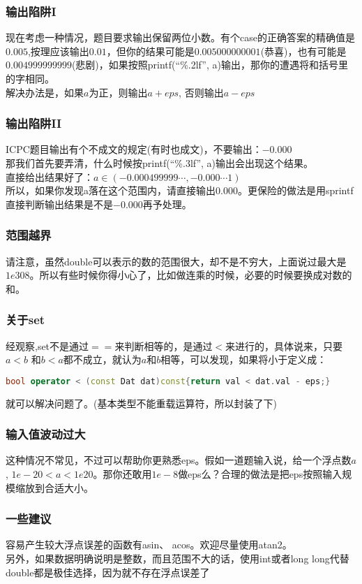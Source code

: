     \subsubsection{输出陷阱I}
	现在考虑一种情况，题目要求输出保留两位小数。有个case的正确答案的精确值是$0.005$,按理应该输出$0.01$，但你的结果可能是$0.005000000001$(恭喜)，也有可能是$0.004999999999$(悲剧)，如果按照\textsf{printf(“\%.2lf”, a)}输出，那你的遭遇将和括号里的字相同。\\
	解决办法是，如果$a$为正，则输出$a+eps$, 否则输出$a-eps$\\
	
    \subsubsection{输出陷阱II}
	ICPC题目输出有个不成文的规定(有时也成文)，不要输出：$-0.000$\\
	那我们首先要弄清，什么时候按\textsf{printf(“\%.3lf”, a)}输出会出现这个结果。\\
	直接给出结果好了：$a\in (-0.000499999\cdots , -0.000\cdots 1)$\\
	所以，如果你发现a落在这个范围内，请直接输出$0.000$。更保险的做法是用\textsf{sprintf}直接判断输出结果是不是$-0.000$再予处理。\\

    \subsubsection{范围越界}
	请注意，虽然double可以表示的数的范围很大，却不是不穷大，上面说过最大是$1e308$。所以有些时候你得小心了，比如做连乘的时候，必要的时候要换成对数的和。\\
	
    \subsubsection{关于set}
	经观察,set不是通过$==$来判断相等的，是通过$<$来进行的，具体说来，只要$a<b$ 和$b<a$都不成立，就认为$a$和$b$相等，可以发现，如果将小于定义成：
	\begin{lstlisting}[language=c++]
bool operator < (const Dat dat)const{return val < dat.val - eps;}
	\end{lstlisting}
	就可以解决问题了。(基本类型不能重载运算符，所以封装了下)\\
	
    \subsubsection{输入值波动过大}
	这种情况不常见，不过可以帮助你更熟悉eps。假如一道题输入说，给一个浮点数$a$, $1e-20 < a < 1e20$。那你还敢用$1e-8$做eps么？合理的做法是把eps按照输入规模缩放到合适大小。\\
	
    \subsubsection{一些建议}
	容易产生较大浮点误差的函数有asin、 acos。欢迎尽量使用atan2。\\
	另外，如果数据明确说明是整数，而且范围不大的话，使用int或者long long代替double都是极佳选择，因为就不存在浮点误差了\\
